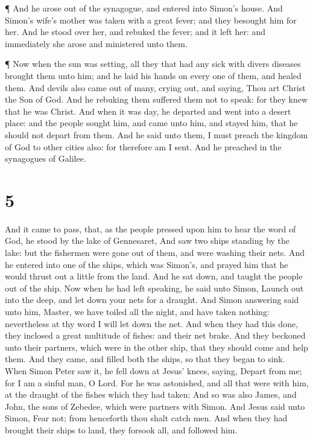  ¶ And he arose out of the synagogue, and entered into
Simon's house. And Simon's wife's mother was taken with a great fever;
and they besought him for her.  And he stood over her, and
rebuked the fever; and it left her: and immediately she arose and
ministered unto them.

 ¶ Now when the sun was setting, all they that had any sick
with divers diseases brought them unto him; and he laid his hands on
every one of them, and healed them.  And devils also came
out of many, crying out, and saying, Thou art Christ the Son of God. And
he rebuking them suffered them not to speak: for they knew that he was
Christ.  And when it was day, he departed and went into a
desert place: and the people sought him, and came unto him, and stayed
him, that he should not depart from them.  And he said unto
them, I must preach the kingdom of God to other cities also: for
therefore am I sent.  And he preached in the synagogues of
Galilee.

\hypertarget{section-4}{%
\section{5}\label{section-4}}

 And it came to pass, that, as the people pressed upon him
to hear the word of God, he stood by the lake of Gennesaret,
 And saw two ships standing by the lake: but the fishermen
were gone out of them, and were washing their nets.  And he
entered into one of the ships, which was Simon's, and prayed him that he
would thrust out a little from the land. And he sat down, and taught the
people out of the ship.  Now when he had left speaking, he
said unto Simon, Launch out into the deep, and let down your nets for a
draught.  And Simon answering said unto him, Master, we have
toiled all the night, and have taken nothing: nevertheless at thy word I
will let down the net.  And when they had this done, they
inclosed a great multitude of fishes: and their net brake. 
And they beckoned unto their partners, which were in the other ship,
that they should come and help them. And they came, and filled both the
ships, so that they began to sink.  When Simon Peter saw it,
he fell down at Jesus' knees, saying, Depart from me; for I am a sinful
man, O Lord.  For he was astonished, and all that were with
him, at the draught of the fishes which they had taken: 
And so was also James, and John, the sons of Zebedee, which were
partners with Simon. And Jesus said unto Simon, Fear not; from
henceforth thou shalt catch men.  And when they had brought
their ships to land, they forsook all, and followed him.

